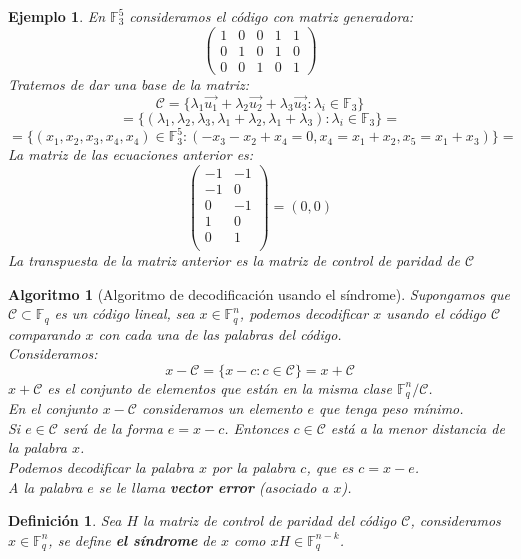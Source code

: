 \documentclass[spanish]{book}
\newtheorem{alg}{Algoritmo}
\newtheorem{mydef}{Definición}
\newtheorem{ejem}{Ejemplo}
\begin{document}
\begin{ejem}
	En $\mathbb{F}_3^5$ consideramos el código con matriz generadora:
	$$
	\left(
	\begin{array}{ccccc}
	1 & 0 & 0 & 1 & 1 \\
	0 & 1 & 0 & 1 & 0 \\
	0 & 0 & 1 & 0 & 1
	\end{array} \right)
	$$
	Tratemos de dar una base de la matriz:
	$$ \mathcal{C}=\{\lambda_1 \vec{u_1} + \lambda_2 \vec{u_2}+\lambda_3\vec{u_3} : \lambda_i \in \mathbb{F}_3\}$$
	$$=\{(\lambda_1, \lambda_2, \lambda_3, \lambda_1+\lambda_2, \lambda_1+\lambda_3) : \lambda_i \in \mathbb{F}_3\}=$$
	$$=\{(x_1, x_2, x_3, x_4, x_4) \in \mathbb{F}_3^5: (-x_3-x_2+x_4=0, x_4=x_1+x_2, x_5=x_1+x_3)\}=$$
	La matriz de las ecuaciones anterior es:
	$$
	\left(
	\begin{array}{cc}
		-1 & -1 \\
		-1 & 0 \\
		0 & -1 \\
		1 & 0 \\
		0 & 1 \\
	\end{array} \right)=(0,0)
	$$
	La transpuesta de la matriz anterior es la matriz de control de paridad de $\mathcal{C}$
\end{ejem}

\begin{alg}[Algoritmo de decodificación usando el síndrome]
	Supongamos que $\mathcal{C} \subset \mathbb{F}_q$ es un código lineal, sea $x \in \mathbb{F}_q^n$, podemos decodificar $x$ usando el código $\mathcal{C}$ comparando $x$ con cada una de las palabras del código. \\
	Consideramos:
	$$ x-\mathcal{C}=\{x-c : c \in \mathcal{C}\}=x+\mathcal{C}$$
	$x + \mathcal{C}$ es el conjunto de elementos que están en la misma clase $\mathbb{F}_q^n / \mathcal{C}$. \\
	En el conjunto $x-\mathcal{C}$ consideramos un elemento $e$ que tenga peso mínimo. \\
	Si $e \in \mathcal{C}$ será de la forma $e=x-c$. Entonces $c \in \mathcal{C}$ está a la menor distancia  de la palabra $x$. \\
	Podemos decodificar la palabra $x$ por la palabra $c$, que es $c=x-e$. \\
	A la palabra $e$ se le llama \textbf{vector error} (asociado a $x$).
\end{alg}


\begin{mydef}
	Sea $H$ la matriz de control de paridad del código $\mathcal{C}$, consideramos $x \in \mathbb{F}_q^n$, se define \textbf{el síndrome} de $x$ como $x H \in \mathbb{F}_q^{n-k}$.
\end{mydef}
\end{document}
